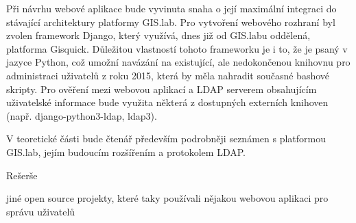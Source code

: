 Při návrhu webové aplikace bude vyvinuta snaha o její maximální
integraci do stávající architektury platformy GIS.lab. Pro vytvoření
webového rozhraní byl zvolen framework Django, který využívá, dnes již
od GIS.labu oddělená, platforma Gisquick. Důležitou vlastností tohoto
frameworku je i to, že je psaný v jazyce Python, což umožní navázání
na existující, ale nedokončenou knihovnu pro administraci uživatelů z
roku 2015, která by měla nahradit současné bashové skripty. Pro
ověření mezi webovou aplikací a LDAP serverem obsahujícím uživatelské
informace bude využita některá z dostupných externích knihoven
(např. django-python3-ldap, ldap3).

V teoretické části bude čtenář především podrobněji seznámen s
platformou GIS.lab, jejím budoucím rozšířením a protokolem LDAP.

Rešerše

jiné open source projekty, které taky používali nějakou webovou aplikaci pro správu uživatelů
